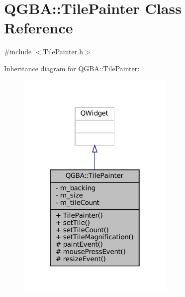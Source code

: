 \hypertarget{class_q_g_b_a_1_1_tile_painter}{}\section{Q\+G\+BA\+:\+:Tile\+Painter Class Reference}
\label{class_q_g_b_a_1_1_tile_painter}


{\ttfamily \#include $<$Tile\+Painter.\+h$>$}



Inheritance diagram for Q\+G\+BA\+:\+:Tile\+Painter\+:
\nopagebreak
\begin{figure}[H]
\begin{center}
\leavevmode
\includegraphics[width=214pt]{class_q_g_b_a_1_1_tile_painter__inherit__graph}
\end{center}
\end{figure}


